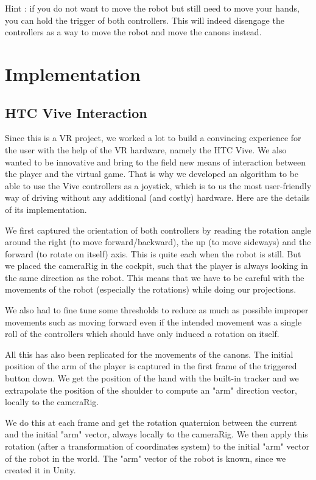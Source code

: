 \documentclass[12pt]{article}
\begin{document}
Hint : if you do not want to move the robot but still need to move your hands, you can hold the trigger of both controllers. This will indeed disengage the controllers as a way to move the robot and move the canons instead.

\section{Implementation}

\subsection{HTC Vive Interaction}

Since this is a VR project, we worked a lot to build a convincing experience for the user with the help of the VR hardware, namely the HTC Vive. We also wanted to be innovative and bring to the field new means of interaction between the player and the virtual game. That is why we developed an algorithm to be able to use the Vive controllers as a joystick, which is to us the most user-friendly way of driving without any additional (and costly) hardware. Here are the details of its implementation.

We first captured the orientation of both controllers by reading the rotation angle around the right (to move forward/backward), the up (to move sideways) and the forward (to rotate on itself) axis. This is quite each when the robot is still. But we placed the cameraRig in the cockpit, such that the player is always looking in the same direction as the robot. This means that we have to be careful with the movements of the robot (especially the rotations) while doing our projections.

We also had to fine tune some thresholds to reduce as much as possible improper movements such as moving forward even if the intended movement was a single roll of the controllers which should have only induced a rotation on itself.

All this has also been replicated for the movements of the canons. The initial position of the arm of the player is captured in the first frame of the triggered button down. We get the position of the hand with the built-in tracker and we extrapolate the position of the shoulder to compute an "arm" direction vector, locally to the cameraRig.

 We do this at each frame and get the rotation quaternion between the current and the initial "arm" vector, always locally to the cameraRig. We then apply this rotation (after a transformation of coordinates system) to the initial "arm" vector of the robot in the world. The "arm" vector of the robot is known, since we created it in Unity.
\end{document}
